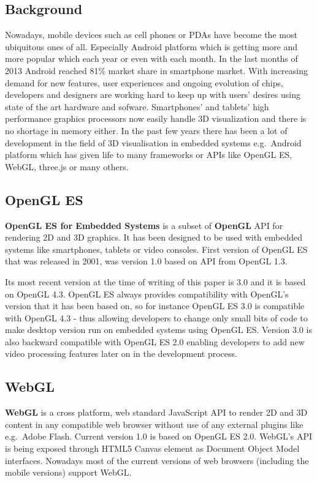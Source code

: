 
\subsection{Background}
Nowadays, mobile devices such as cell phones or PDAs have become the most ubiquitous ones of all.
Especially Android platform which is getting more and more popular which each year or even with each month.
In the last months of 2013 Android reached 81\% market share in smartphone market.
With increasing demand for new features, user experiences and ongoing evolution of chips,  developers and designers are working hard to keep up with users' desires using state of the art hardware and sofware.
Smartphones’ and tablets’ high performance graphics processors now easily handle 3D visualization and there is no shortage in memory either.
In the past few years there has been a lot of development in the field of 3D visualisation in embedded systems e.g.\ Android platform which has given life to many frameworks or APIs like OpenGL ES, WebGL, three.js or many others.

\subsection{OpenGL ES}
\textbf{OpenGL ES for Embedded Systems} \cite{opengles_kronos} is a subset of \textbf{OpenGL} \cite{opengl_kronos} API for rendering 2D and 3D graphics.
It has been designed to be used with embedded systems like smartphones, tablets or video consoles.
First version of OpenGL ES that was released in 2001, was version 1.0 based on API from OpenGL 1.3.

Its most recent version at the time of writing of this paper is 3.0 and it is based on OpenGL 4.3.
OpenGL ES always provides compatibility with OpenGL's version that it has been based on, so for instance OpenGL ES 3.0 is compatible with OpenGL 4.3 - thus allowing developers to change only small bits of code to make desktop version run on embedded systems using OpenGL ES.
Version 3.0 is also backward compatible with OpenGL ES 2.0 enabling developers to add new video processing features later on in the development process.

\subsection{WebGL}
\textbf{WebGL} \cite{webgl_kronos} is a cross platform, web standard JavaScript API to render 2D and 3D content in any compatible web browser without use of any external plugins like e.g.\ Adobe Flash.
Current version 1.0 is based on OpenGL ES 2.0.
WebGL's API is being exposed through HTML5 Canvas element as Document Object Model interfaces.
Nowadays most of the current versions of web browsers (including the mobile versions) support WebGL.

